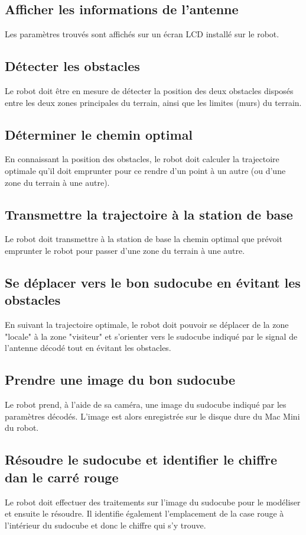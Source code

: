 \subsection{Afficher les informations de l'antenne}
Les paramètres trouvés sont affichés sur un écran LCD installé sur le robot.
\subsection{Détecter les obstacles}
Le robot doit être en mesure de détecter la position des deux obstacles disposés entre les deux zones principales du terrain, ainsi que les limites (murs) du terrain.
\subsection{Déterminer le chemin optimal}
En connaissant la position des obstacles, le robot doit calculer la trajectoire optimale qu'il doit emprunter pour ce rendre d'un point à un autre (ou d'une zone du terrain à une autre).
\subsection{Transmettre la trajectoire à la station de base}
Le robot doit transmettre à la station de base la chemin optimal que prévoit emprunter le robot pour passer d'une zone du terrain à une autre.
\subsection{Se déplacer vers le bon sudocube en évitant les obstacles}
En suivant la trajectoire optimale, le robot doit pouvoir se déplacer de la zone "locale" à la zone "visiteur" et s'orienter vers le sudocube indiqué par le signal de l'antenne décodé tout en évitant les obstacles.
\subsection{Prendre une image du bon sudocube}
Le robot prend, à l'aide de sa caméra, une image du sudocube indiqué par les paramètres décodés. L'image est alors enregistrée sur le disque dure du Mac Mini du robot.
\subsection{Résoudre le sudocube et identifier le chiffre dan le carré rouge}
Le robot doit effectuer des traitements sur l'image du sudocube pour le modéliser et ensuite le résoudre. Il identifie également l'emplacement de la case rouge à l'intérieur du sudocube et donc le chiffre qui s'y trouve.
